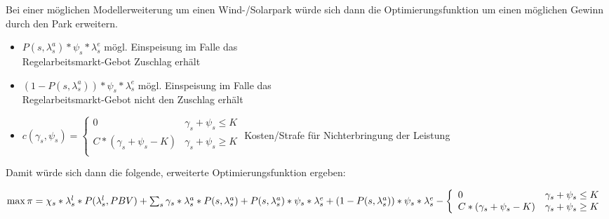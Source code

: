 \documentclass[british,         %
BCOR=2mm,                       %
11pt,                           %
a4paper,						%
oneside,						%
cdgeometry,                     %
toc=chapterentrydotfill,        %
toc=indent,                     %
bibliography=totoc,         	%
listof=totoc,                   %
numbers=noenddot,				%
parskip=full,                   %
cdmath=false					%
]{article}                  %
\begin{document}
Bei einer möglichen Modellerweiterung um einen Wind-/Solarpark würde sich dann die Optimierungsfunktion
um einen möglichen Gewinn durch den Park erweitern.\\


\begin{itemize}
	\item $ P(s, \lambda_s^a) * \psi_s * \lambda_s^e$ mögl. Einspeisung im Falle das \\Regelarbeitsmarkt-Gebot Zuschlag erhält\\
	\item $ (1 - P(s, \lambda_s^a)) * \psi_s * \lambda_s^e$ mögl. Einspeisung im Falle das \\Regelarbeitsmarkt-Gebot nicht den Zuschlag erhält\\
	\item 	$c(\gamma_s, \psi_s) = \left\{
		      \begin{array}{ll}
			      0                           & \gamma_s + \psi_s \leq K \\
			      C * (\gamma_s + \psi_s - K) & \gamma_s + \psi_s \geq K \\
		      \end{array}
		      \right. $ Kosten/Strafe für Nichterbringung der Leistung\\
	      
\end{itemize}




Damit würde sich dann die folgende, erweiterte Optimierungsfunktion ergeben:\\
\begin{addmargin}[25pt]{0pt}
	$\max \pi = \chi_s * \lambda_s^l * P(\lambda_s^l, PBV) \\
		+ \sum_{s} \gamma_s * \lambda_s^a * P(s,\lambda_s^a)\\
		+P(s, \lambda_s^a) * \psi_s * \lambda_s^e\\
		+(1 - P(s, \lambda_s^a)) * \psi_s * \lambda_s^e\\
		- \left\{
		\begin{array}{ll}
			0                           & \gamma_s + \psi_s \leq K \\
			C * (\gamma_s + \psi_s - K) & \gamma_s + \psi_s \geq K \\
		\end{array}
		\right. $
\end{addmargin}
\end{document}
